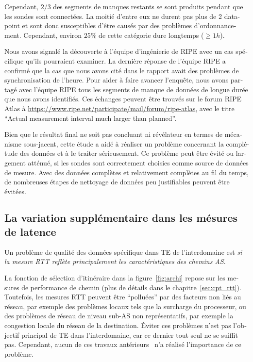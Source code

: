 \begin{otherlanguage}{french}
Cependant, $2/3$ des segments de manques restants se sont produits pendant que les sondes sont connectées.
La moitié d'entre eux ne durent pas plus de 2 datapoint et sont donc susceptibles d'être causés par des problèmes d'ordonnancement. 
Cependant, environ $25\%$ de cette catégorie dure longtemps ($\geq 1h$).

Nous avons signalé la découverte à l'équipe d'ingénierie de RIPE avec un cas spécifique qu'ils pourraient examiner.
La dernière réponse de l'équipe RIPE a confirmé que la cas que nous avons cité dans le rapport avait des problèmes de synchronisation de l'heure. 
Pour aider à faire avancer l'enquête, nous avons partagé avec l'équipe RIPE tous les segments de manque de données de longue durée que nous avons identifiés. 
Ces échanges peuvent être trouvés sur le forum RIPE Atlas à \url{https://www.ripe.net/participate/mail/forum/ripe-atlas}, avec le titre ``Actual measurement interval much larger than planned''.

Bien que le résultat final ne soit pas concluant ni révélateur en termes de mécanisme sous-jacent, cette étude a aidé à réaliser un problème concernant la complétude des données et à le traiter sérieusement.
Ce problème peut être évité ou largement atténué, si les sondes sont correctement choisies comme source de données de mesure.
Avec des données complètes et relativement complètes au fil du temps, de nombreuses étapes de nettoyage de données peu justifiables peuvent être évitées.

\subsection{La variation supplémentaire dans les mésures de latence}

Un problème de qualité des données spécifique dans TE de l'interdomaine est \textit{si la mesure RTT reflète principalement les caractéristiques des chemins AS}.

La fonction de sélection d'itinéraire dans la figure~\ref{fig:archi} repose sur les mesures de performance de chemin (plus de détails dans le chapitre~\ref{sec:cpt_rtt}).
Toutefois, les mesures RTT peuvent être ``polluées'' par des facteurs non liés au réseau, par exemple des problèmes locaux tels que la surcharge du processeur,
 ou des problèmes de réseau de niveau sub-AS non représentatifs, par exemple la congestion locale du réseau de la destination.
Éviter ces problèmes n'est pas l'objectif principal de TE dans l'interdomaine, car ce dernier tout seul ne se suiffit pas.
Cependant, aucun de ces travaux antérieurs~\cite{Goldenberg2004, Akella2008} n'a réalisé l'importance de ce problème.


\end{otherlanguage}
